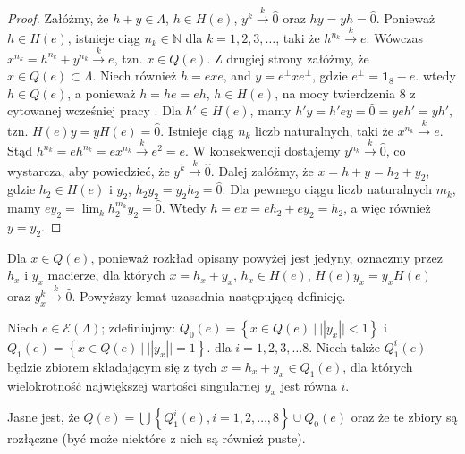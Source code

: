 {\begin{proof}
    Załóżmy, że $h + y \in \Lambda$, $h \in H(e)$, $y^{k}  \overset{k}{\rightarrow}  \hat{0}$
    oraz $hy = yh = \hat{0}$.
Ponieważ $h \in H(e)$, istnieje ciąg $n_{k} \in \mathbb{N}$ dla $k =1,2,3,\ldots$,
taki że $h^{n_{k}} \overset{k}{\rightarrow} e$.
Wówczas $x^{n_{k}}  = h^{n_{k}} + y^{n_{k}}  \overset{k}{\rightarrow}  e$, tzn.
    $x \in Q(e)$.
Z drugiej strony
załóżmy, że $x \in Q(e) \subset \Lambda$.
Niech również $h = e x e$, and $y = e^{\perp} x e^{\perp}$,
gdzie $e^{\perp} = \mathbf{1}_{8} - e$.
wtedy $h \in Q(e)$, a ponieważ
    $h =  h e = e h$,
    $h \in H(e)$, na mocy twierdzenia 8 z cytowanej wcześniej pracy
    \cite{schwarz1955hausdorff}.
Dla $h' \in H(e)$, mamy
    $h' y = h' e y = \hat{0} = y e h' = yh'$,
tzn. $H(e) y = y H (e) = \hat{0}$.
Istnieje ciąg $n_{k}$ liczb naturalnych, taki że
    $x^{n_{k}}  \overset{k}{\rightarrow}  e$.
Stąd
    $h^{n_{k}} = e h^{n_{k}}  = e x^{n_{k}}  \overset{k}{\rightarrow} e^{2}  = e$.
W konsekwencji dostajemy $y^{n_{k}}  \overset{k}{\rightarrow}  \hat{0}$,
co wystarcza, aby powiedzieć, że $y^{k} \overset{k}{\rightarrow} \hat{0}$.
Dalej załóżmy, że $x = h + y = h_{2} + y_{2}$,
    gdzie $h_{2} \in H(e)$ i $y_{2}$,
    $h_{2} y_{2} = y_{2} h_{2} = \hat{0}$.
Dla pewnego ciągu liczb naturalnych $m_{k}$, mamy
    $e y_{2} = \lim_{k} h_{2}^{m_{k}} y_{2} = \hat{0}$.
Wtedy $h = e x = e h_{2} + e y_{2} = h_{2}$, a więc również $y = y_{2}$.
\end{proof}

Dla $x \in Q(e)$, ponieważ rozkład opisany powyżej jest jedyny,
oznaczmy przez $h_{x}$ i $y_{x}$ macierze, dla których
$x = h_{x} + y_{x}$,
$h_{x} \in H(e)$, $H(e) y_{x} = y_{x} H(e)$ oraz
$y_{x}^{k} \overset{k}{\rightarrow} \hat{0}$.
Powyższy lemat uzasadnia następującą definicję.

\begin{Definition}
    Niech $e \in \mathcal{E}(\Lambda)$;
    zdefiniujmy:
    $Q_{0}(e) = \left \{ x \in Q(e) \: | \: || y_{x} || < 1 \right \}$ i
    $Q_{1}(e) = \left \{ x \in Q(e) \: | \: || y_{x} || = 1 \right \}$.
    dla $i = 1, 2, 3, \ldots 8$.
    Niech także $Q_{1}^{i}(e)$ będzie zbiorem składającym się z tych
    $x = h_{x} + y_{x} \in Q_{1}(e)$,
    dla których wielokrotność największej wartości singularnej $y_{x}$
    jest równa $i$.
\end{Definition}

Jasne jest, że
$Q(e) = \bigcup \left \{ Q_{1}^{i}(e), i=1,2,\ldots,8 \right \} \cup Q_{0}(e)$
oraz że te zbiory są rozłączne (być może niektóre z nich są również puste).

}
